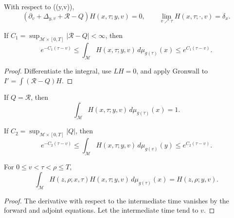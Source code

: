\begin{lemma}
\label{lem:chow-iii-heat-kernel-second-variables-adjoint}
With respect to ((y,v)),
\[
 (\partial_v+\Delta_{y,v}+\mathcal R-Q)H(x,\tau;y,v)=0,
 \qquad \lim_{v\nearrow\tau}H(x,\tau;\cdot,v)=\delta_x.
\]
\end{lemma}

\begin{lemma}
\label{lem:chow-iii-closed-heat-kernel-mass-bound}
If \(C_1=\sup_{\mathcal M\times[0,T]}|\mathcal R-Q|<\infty\), then
\[
 e^{-C_1(\tau-v)}\le
 \int_{\mathcal M}H(x,\tau;y,v)\,d\mu_{g(\tau)}(x)
 \le e^{C_1(\tau-v)}.
\]
\end{lemma}
\begin{proof}
Differentiate the integral, use \(LH=0\), and apply Gronwall to
\(I'=\int(\mathcal R-Q)H\).
\end{proof}

\begin{corollary}[Mass preservation when \(Q=\mathcal R\)]
\label{cor:chow-iii-closed-heat-kernel-mass-preservation}
If \(Q=\mathcal R\), then
\[
 \int_{\mathcal M}H(x,\tau;y,v)\,d\mu_{g(\tau)}(x)=1.
\]
\end{corollary}

\begin{lemma}
\label{lem:chow-iii-closed-heat-kernel-second-mass-bound}
If \(C_2=\sup_{\mathcal M\times[0,T]}|Q|\), then
\[
 e^{-C_2(\tau-v)}\le
 \int_{\mathcal M}H(x,\tau;y,v)\,d\mu_{g(v)}(y)
 \le e^{C_2(\tau-v)}.
\]
\end{lemma}

\begin{lemma}
\label{lem:chow-iii-closed-heat-kernel-semigroup}
For \(0\le v<\tau<\rho\le T\),
\[
 \int_{\mathcal M}H(z,\rho;x,\tau)H(x,\tau;y,v)
 \,d\mu_{g(\tau)}(x)=H(z,\rho;y,v).
\]
\end{lemma}
\begin{proof}
The derivative with respect to the intermediate time vanishes by the forward
and adjoint equations.  Let the intermediate time tend to \(v\).
\end{proof}

